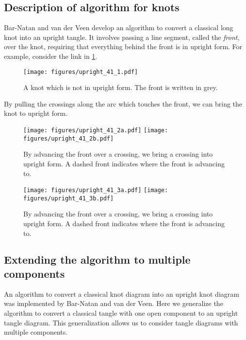 
\subsection{Description of algorithm for knots}

Bar-Natan and van der Veen develop an algorithm to convert a classical long knot
into an upright tangle. It involves passing a line segment, called the
\emph{front}, over the knot, requiring that everything behind the front is in
upright form. For example, consider the link in \cref{fig:figures-upright_41_1}.
\begin{figure}[h]
        \centering
        \texttt{[image: figures/upright\_41\_1.pdf]}
        \caption{A knot which is not in upright form. The front is written in
        grey.}
        \label{fig:figures-upright_41_1}
\end{figure}
By pulling the crossings along the arc which touches the front, we can bring the
knot to upright form.
\begin{figure}[h]
        \centering
        \texttt{[image: figures/upright\_41\_2a.pdf]}
        \texttt{[image: figures/upright\_41\_2b.pdf]}
        \caption{By advancing the front over a crossing, we bring a crossing
        into upright form. A dashed front indicates where the front is advancing
        to.
        }
        \label{fig:figures-upright_41_2}
\end{figure}
\begin{figure}[h]
        \centering
        \texttt{[image: figures/upright\_41\_3a.pdf]}
        \texttt{[image: figures/upright\_41\_3b.pdf]}
        \caption{By advancing the front over a crossing, we bring a crossing
        into upright form. A dashed front indicates where the front is advancing
        to.
        }
        \label{fig:figures-upright_41_3}
\end{figure}

\subsection{Extending the algorithm to multiple components}

An algorithm to convert a classical knot diagram into an upright knot diagram
was implemented by Bar-Natan and van der Veen. Here we generalize the algorithm
to convert a classical tangle with one open component to an upright tangle
diagram. This generalization allows us to consider tangle diagrams with multiple
components.

